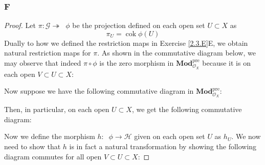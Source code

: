\documentclass{article}
\newcommand{\fF}{\mathscr{F}}
\newcommand{\fG}{\mathscr{G}}
\newcommand{\fH}{\mathscr{H}}
\newcommand{\fO}{\mathscr{O}}
\newcommand{\Mod}{\mathbf{Mod}} %
\DeclareMathOperator{\res}{\mathrm{res}}
\DeclareMathOperator{\cok}{\mathrm{cok}}
\DeclareMathOperator{\cokpre}{\cok_{\text{pre}}}
\begin{document}
\subsubsection{F}\label{2.3.F}
\begin{proof}
    Let $\pi:\fG\twoheadrightarrow \cokpre \phi$ be the projection defined on each open set $U\subset X$ as
    \[
    \pi_U=\cok \phi(U)
    \]
    Dually to how we defined the restriction maps in Exercise \ref{2.3.E}E, we obtain natural restriction maps for $\pi$. As shown in the commutative diagram below, we may observe that indeed $\pi \circ \phi$ is the zero morphism in $\Mod_{\fO_X}^{\text{pre}}$ because it is on each open $V\subset U\subset X$:
    \begin{center}
    \end{center}
    Now suppose we have the following commutative diagram in $\Mod_{\fO_X}^{\text{pre}}$:
    \begin{center}
    \end{center}
    Then, in particular, on each open $U\subset X$, we get the following commutative diagram:
    \begin{center}
    \end{center}
    Now we define the morphism $h:\cokpre \phi \to \fH$ given on each open set $U$ as $h_U$. We now need to show that $h$ is in fact a natural transformation by showing the following diagram commutes for all open $V\subset U\subset X$:

\end{proof}
\end{document}
